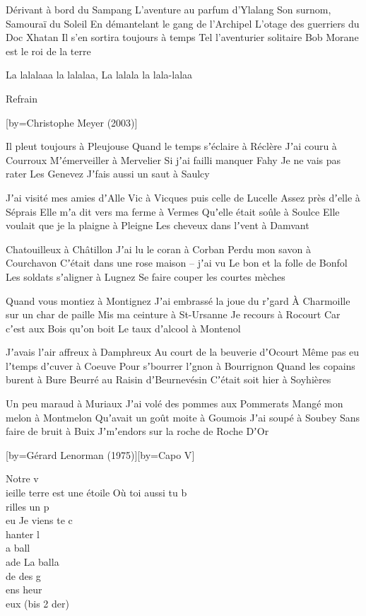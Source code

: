 \beginverse
Dérivant à bord du Sampang
L'aventure au parfum d'Ylalang
Son surnom, Samouraï du Soleil 
En démantelant le gang de l'Archipel 
L'otage des guerriers du Doc Xhatan 
Il s'en sortira toujours à temps
Tel l'aventurier solitaire
Bob Morane est le roi de la terre
\endverse

\beginverse
La lalalaaa la lalalaa, La lalala la lala-lalaa \\[bis]
\endverse

	Refrain

[by={Christophe Meyer (2003)}]

\beginverse
Il pleut toujours à Pleujouse          
Quand le temps sʼéclaire à Réclère 
Jʼai couru à Courroux 
Mʼémerveiller à Mervelier
Si jʼai failli manquer Fahy   
Je ne vais pas rater Les Genevez 
Jʼfais aussi un saut à Saulcy   
\endverse

\beginverse
Jʼai visité mes amies dʼAlle
Vic à Vicques puis celle de Lucelle     
Assez près dʼelle à Séprais
Elle mʼa dit vers ma ferme à Vermes 
Quʼelle était soûle à Soulce
Elle voulait que je la plaigne à Pleigne 
Les cheveux dans lʼvent à Damvant 
\endverse

\beginverse
Chatouilleux à Châtillon
Jʼai lu le coran à Corban
Perdu mon savon à Courchavon 
Cʼétait dans une rose maison – jʼai vu 
Le bon et la folle de Bonfol      
Les soldats sʼaligner à Lugnez
Se faire couper les courtes mèches 
\endverse

\beginverse
Quand vous montiez à Montignez     
Jʼai embrassé la joue du rʼgard
À Charmoille sur un char de paille Mis ma ceinture à St-Ursanne 
Je recours à Rocourt
Car cʼest aux Bois quʼon boit     
Le taux dʼalcool à Montenol 
\endverse

\beginverse
Jʼavais lʼair affreux à Damphreux     
Au court de la beuverie dʼOcourt     
Même pas eu lʼtemps dʼcuver à Coeuve   
Pour sʼbourrer lʼgnon à Bourrignon    
Quand les copains burent à Bure
Beurré au Raisin dʼBeurnevésin
Cʼétait soit hier à Soyhières
\endverse

\beginverse
Un peu maraud à Muriaux
Jʼai volé des pommes aux Pommerats 
Mangé mon melon à Montmelon 
Quʼavait un goût moite à Goumois
Jʼai soupé à Soubey
Sans faire de bruit à Buix
Jʼmʼendors sur la roche de Roche DʼOr
\endverse

[by={Gérard Lenorman (1975)}][by={Capo V}]

\beginverse
Notre v\\[Do]ieille terre est une étoile
Où toi aussi tu b\\[Rém]rilles un p\\[Sol]eu
Je viens te c\\[Rém]hanter l\\[Sol7]a ball\\[Do]ade
La balla\\[Rém]de des g\\[Sol7]ens heur\\[Do]eux
(bis 2 der)
\endverse

